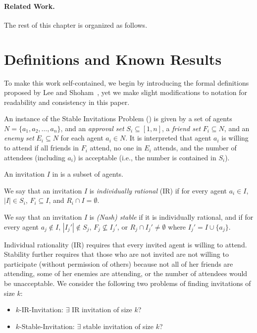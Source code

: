 \paragraph{Related Work.} %


The rest of this chapter is organized as follows.







\section{Definitions and Known Results} \label{SIP:sec:SIP:prelim}

To make this work self-contained, we begin by introducing the formal definitions proposed by 
Lee and Shoham~\cite{LEE15AAAI}, yet we make slight modifications to notation for readability and consistency in this paper.

\begin{definition}
An instance of the Stable Invitations Problem (\SIP) is given by a set of agents $N = \{a_1, a_2, \dots, a_n\}$, and an {\em approval set} $S_i \subseteq [1,n]$, a {\em friend set} $F_i \subseteq N$, and an {\em enemy set} $E_i \subseteq N$ for each agent $a_i\in N$.
It is interpreted that agent $a_i$ is willing to attend if all friends in $F_i$ attend, no one in $E_i$ attends, and the number of attendees (including $a_i$) is acceptable (i.e., the number is contained in $S_i$).
\end{definition}

\begin{definition} 
An invitation $I$ in \SIPs is a subset of agents.

	We say that an invitation $I$ is {\em individually rational} (IR) if for every agent $a_i\in I$, $|I| \in S_i$, $F_i \subseteq I$, and $R_i \cap I = \emptyset$.
	
	We say that an invitation $I$ is {\em (Nash) stable} if it is individually rational, and if for every agent $a_j \not\in I$, $|I_j'| \not\in S_j$, $F_j \not\subseteq I_j'$, or $R_j \cap I_j' \neq \emptyset$ where $I_j' = I \cup \{a_j\}$.
\end{definition}

Individual rationality (IR) requires that every invited agent is willing to attend.
Stability further requires that those who are not invited are not willing to participate (without permission of others)
because not all of her friends are attending, some of her enemies are attending, or the number of attendees would be unacceptable. 
We consider the following two problems of finding invitations of size $k$:
\begin{itemize}
	\item $k$-IR-Invitation: $\exists$ IR invitation of size $k$?
	\item $k$-Stable-Invitation: $\exists$ stable invitation of size $k$?
\end{itemize}

